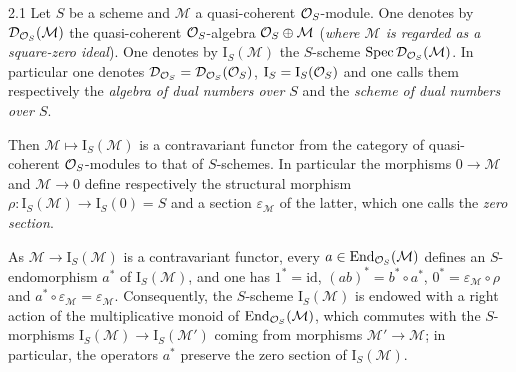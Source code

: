 \begin{definition}{2.1}
\label{II.2.1}
Let \(S\) be a scheme and \(\mathcal{M}\) a quasi-coherent
\(\mathcal{O}_S\)-module. One denotes by \(\mathcal{D}_{\mathcal{O}_S}(\mathcal{M})\) the
quasi-coherent \(\mathcal{O}_S\)-algebra \(\mathcal{O}_S\oplus\mathcal{M}\)
(\emph{where \(\mathcal{M}\) is regarded as a square-zero ideal}). One
denotes by \(\mathrm{I}_S(\mathcal{M})\) the \(S\)-scheme
\(\operatorname{Spec}\mathcal{D}_{\mathcal{O}_S}(\mathcal{M})\).%
{\renewcommand{\thefootnote}{(6)}}
In particular one denotes
\(\mathcal{D}_{\mathcal{O}_S}=\mathcal{D}_{\mathcal{O}_S}(\mathcal{O}_S)\),
\(\mathrm{I}_S=\mathrm{I}_S(\mathcal{O}_S)\) and one calls them respectively the
\emph{algebra of dual numbers over \(S\)} and the \emph{scheme of dual
numbers over \(S\)}.

Then \(\mathcal{M}\mapsto\mathrm{I}_S(\mathcal{M})\) is a contravariant
functor from the category of quasi-coherent \(\mathcal{O}_S\)-modules to that of
\(S\)-schemes. In particular the morphisms \(0\to\mathcal{M}\) and
\(\mathcal{M}\to 0\) define respectively the structural morphism
\(\rho\colon\mathrm{I}_S(\mathcal{M})\to\mathrm{I}_S(0)=S\) and a section
\(\varepsilon_{\mathcal{M}}\) of the latter, which one calls the
\emph{zero section}.%
{\renewcommand{\thefootnote}{(7)}}
\end{definition}

\label{II.2.1.1}
{\renewcommand{\thefootnote}{(8)}}%
As \(\mathcal{M}\to\mathrm{I}_S(\mathcal{M})\) is a contravariant functor,
every \(a\in\operatorname{End}_{\mathcal{O}_S}(\mathcal{M})\) defines an \(S\)-endomorphism \(a^*\)
of \(\mathrm{I}_S(\mathcal{M})\), and one has \(1^*=\mathrm{id}\),
\((ab)^*=b^*\circ a^*\), \(0^*=\varepsilon_{\mathcal{M}}\circ\rho\) and
\(a^*\circ\varepsilon_{\mathcal{M}}=\varepsilon_{\mathcal{M}}\).
Consequently, the \(S\)-scheme \(\mathrm{I}_S(\mathcal{M})\) is endowed with a
right action of the multiplicative monoid of \(\operatorname{End}_{\mathcal{O}_S}(\mathcal{M})\),
which commutes with the \(S\)-morphisms
\(\mathrm{I}_S(\mathcal{M})\to\mathrm{I}_S(\mathcal{M}')\) coming from
morphisms \(\mathcal{M}'\to\mathcal{M}\); in particular, the operators
\(a^*\) preserve the zero section of \(\mathrm{I}_S(\mathcal{M})\).

